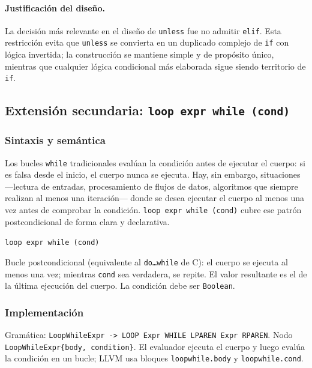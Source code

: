\documentclass[11pt,a4paper]{article}
\begin{document}
\paragraph{Justificación del diseño.} La decisión más relevante en el diseño de \texttt{unless} fue no admitir \texttt{elif}. Esta restricción evita que \texttt{unless} se convierta en un duplicado complejo de \texttt{if} con lógica invertida; la construcción se mantiene simple y de propósito único, mientras que cualquier lógica condicional más elaborada sigue siendo territorio de \texttt{if}.

\subsection{Extensión secundaria: \texttt{loop expr while (cond)}}

\subsubsection{Sintaxis y semántica}

Los bucles \texttt{while} tradicionales evalúan la condición antes de ejecutar el cuerpo: si es falsa desde el inicio, el cuerpo nunca se ejecuta. Hay, sin embargo, situaciones —lectura de entradas, procesamiento de flujos de datos, algoritmos que siempre realizan al menos una iteración— donde se desea ejecutar el cuerpo al menos una vez antes de comprobar la condición. \texttt{loop expr while (cond)} cubre ese patrón postcondicional de forma clara y declarativa.

\begin{center}
\texttt{loop expr while (cond)}
\end{center}

Bucle postcondicional (equivalente al \texttt{do\ldots while} de C): el cuerpo se ejecuta al menos una vez; mientras \texttt{cond} sea verdadera, se repite. El valor resultante es el de la última ejecución del cuerpo. La condición debe ser \texttt{Boolean}.

\subsubsection{Implementación}

Gramática: \texttt{LoopWhileExpr -> LOOP Expr WHILE LPAREN Expr RPAREN}. Nodo \texttt{LoopWhileExpr\{body, condition\}}. El evaluador ejecuta el cuerpo y luego evalúa la condición en un bucle; LLVM usa bloques \texttt{loopwhile.body} y \texttt{loopwhile.cond}.
\end{document}
